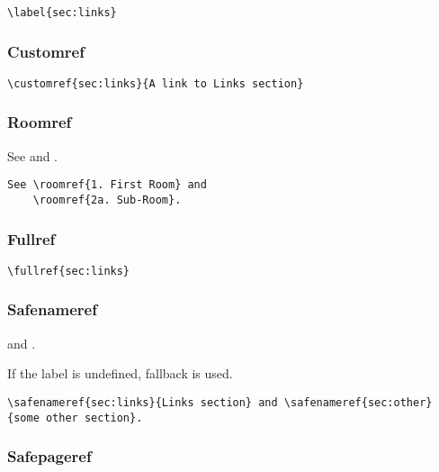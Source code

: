 \documentclass[itdr]{subfiles}
\begin{document}
\begin{lstlisting}
\label{sec:links}
\end{lstlisting}

\subsubsection{Customref}


\begin{lstlisting}
\customref{sec:links}{A link to Links section}
\end{lstlisting}


\subsubsection{Roomref}

See  and .

\begin{lstlisting}
See \roomref{1. First Room} and
	\roomref{2a. Sub-Room}.
\end{lstlisting}


\subsubsection{Fullref}


\begin{lstlisting}
\fullref{sec:links}
\end{lstlisting}


\subsubsection{Safenameref}

 and .

If the label is undefined, fallback is used.

\begin{lstlisting}
\safenameref{sec:links}{Links section} and \safenameref{sec:other}{some other section}.
\end{lstlisting}


\subsubsection{Safepageref}
\end{document}
